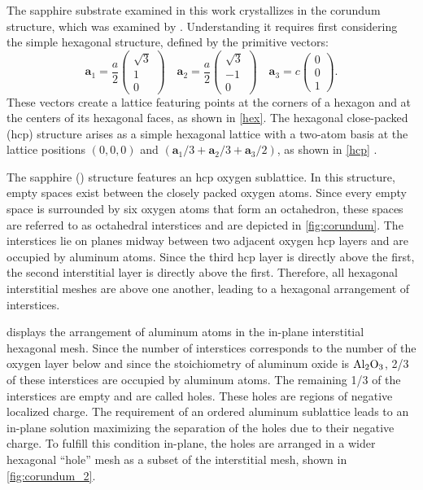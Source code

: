 The sapphire substrate examined in this work crystallizes in the corundum structure,
which was examined by . Understanding it
requires first considering the simple hexagonal structure, defined by the primitive
vectors:
\begin{equation}
	\mathbf{a}_{1}=\frac{a}{2}
	\begin{pmatrix}
		\sqrt{ 3 } \\
		1          \\
		0
	\end{pmatrix}
	\quad \mathbf{a}_{2}=\frac{a}{2}
	\begin{pmatrix}
		\sqrt{ 3 } \\
		-1         \\
		0
	\end{pmatrix}
	\quad \mathbf{a}_{3}=c
	\begin{pmatrix}
		0 \\
		0 \\
		1
	\end{pmatrix}. \label{eq:hex}
\end{equation}
These vectors create a lattice featuring points at the corners of a hexagon and
at the centers of its hexagonal faces, as shown in \cref{hex}. The hexagonal
close-packed (hcp) structure arises as a simple hexagonal lattice with a two-atom
basis at the lattice positions $(0,0,0)$ and
$(\mathbf{a}_{1}/3 + \mathbf{a}_{2}/3 + \mathbf{a}_{3}/2)$, as shown in \cref{hcp}
\autocite{Ashcroft}.

The sapphire () structure features an hcp oxygen sublattice. In this
structure, empty spaces exist between the closely packed oxygen atoms. Since
every empty space is surrounded by six oxygen atoms that form an octahedron, these
spaces are referred to as octahedral interstices and are depicted in \cref{fig:corundum}.
The interstices lie on planes midway between two adjacent oxygen hcp layers and
are occupied by aluminum atoms. Since the third hcp layer is directly above the first,
the second interstitial layer is directly above the first. Therefore, all
hexagonal interstitial meshes are above one another, leading to a hexagonal arrangement
of interstices.

 displays the arrangement of aluminum atoms in the in-plane interstitial
hexagonal mesh. Since the number of interstices corresponds to the number of the
oxygen layer below and since the stoichiometry of aluminum oxide is $\ce{Al2O3}$,
2/3 of these interstices are occupied by aluminum atoms. The remaining 1/3 of
the interstices are empty and are called holes. These holes are regions of negative
localized charge. The requirement of an ordered aluminum sublattice leads to an
in-plane solution maximizing the separation of the holes due to their negative
charge. To fulfill this condition in-plane, the holes are arranged in a wider
hexagonal ``hole'' mesh as a subset of the interstitial mesh, shown in \cref{fig:corundum_2}.

